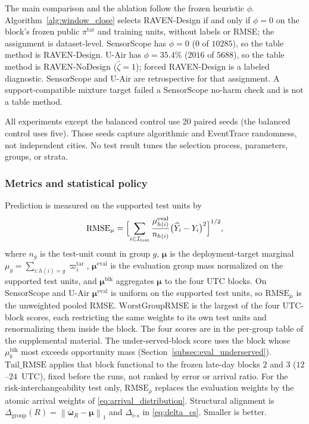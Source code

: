 The main comparison and the ablation follow the frozen heuristic $\phi$.  Algorithm~\ref{alg:window_close}
selects RAVEN-Design if and only if $\phi=0$ on the block's frozen public $\pi^{\mathrm{tar}}$
and training units, without labels or RMSE; the assignment is
dataset-level.  SensorScope has $\phi=0$ ($0$ of $10285$), so the
table method is RAVEN-Design.  U-Air has $\phi=35.4\%$ ($2016$ of $5688$), so the
table method is RAVEN-NoDesign
($\widehat\zeta=1$); forced
RAVEN-Design is a labeled diagnostic.  SensorScope and U-Air are retrospective
for that assignment.  A support-compatible mixture target failed a
SensorScope no-harm check and is not a table method.

All experiments except the balanced control use 20 paired seeds (the balanced control uses five).  Those seeds capture
algorithmic and EventTrace randomness, not independent cities.  No test
result tunes the selection process, parameters, groups, or strata.

\subsubsection{Metrics and statistical policy}

Prediction is measured on the supported test units by
\[
 \mathrm{RMSE}_{\mu}
 =
 \Bigl[\sum_{i\in\mathcal{I}_{\mathrm{test}}}
 \frac{\mu^{\mathrm{eval}}_{h(i)}}{n_{h(i)}}
 \bigl(\widehat Y_i-Y_i\bigr)^2\Bigr]^{1/2},
\]
where $n_g$ is the test-unit count in group $g$, $\boldsymbol\mu$ is the
deployment-target marginal $\mu_g=\sum_{i:h(i)=g}\varpi_i^{\mathrm{tar}}$,
$\boldsymbol\mu^{\mathrm{eval}}$ is the evaluation group mass normalized on
the supported test units, and $\boldsymbol\mu^{\mathrm{blk}}$ aggregates
$\boldsymbol\mu$ to the four UTC blocks.  On SensorScope and U-Air
$\boldsymbol\mu^{\mathrm{eval}}$ is uniform on the supported test units, so
$\mathrm{RMSE}_{\mu}$ is the unweighted pooled RMSE.
$\mathrm{WorstGroupRMSE}$ is the largest of the four UTC-block scores, each
restricting the same weights to its own test units and renormalizing them
inside the block.  The four scores are in the per-group table of the
supplemental material.  The under-served-block score uses the block whose
$\mu^{\mathrm{blk}}_b$ most exceeds opportunity mass
(Section~\ref{subsec:eval_underserved}).
$\mathrm{Tail\_RMSE}$ applies that block functional to the frozen late-day
blocks $2$ and $3$ ($12$--$24$~UTC), fixed before the runs, not ranked by
error or arrival ratio.
For the risk-interchangeability test only, $\mathrm{RMSE}_{\rho}$ replaces the
evaluation weights by the atomic arrival weights of
\eqref{eq:arrival_distribution}.  Structural
alignment is $\Delta_{\mathrm{group}}(R)=\left\|\overline{\boldsymbol\omega}_R-\boldsymbol\mu\right\|_1$
and $\Delta_{c\text{-}s}$ in \eqref{eq:delta_cs}.  Smaller is better.

